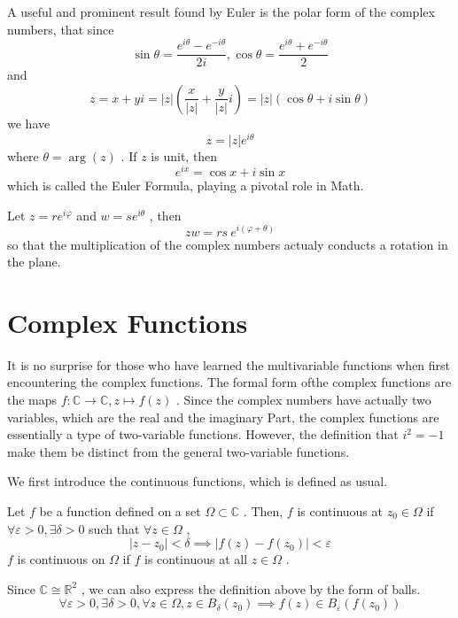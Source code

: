 \documentclass[12pt]{report}
\theoremstyle{mydefstyle}
\newcommand{\RR}{\mathbb{R}}
\newcommand{\CC}{\mathbb{C}}
\begin{document}
A useful and prominent result found by Euler is the polar form of the complex numbers, that since 
\[ \sin \theta = \frac{e^{i \theta}-e^{-i\theta}}{2i}, \cos \theta = \frac{e^{i \theta}+e^{-i\theta}}{2} \]
and 
\[ z=x+yi=|z|\left(\frac{x}{|z|}+\frac{y}{|z|}i\right)=|z|(\cos \theta + i \sin \theta) \]
we have 
\[ z= |z| e^{i\theta} \]
where $\theta = \arg(z)$ . If $z$ is unit, then 
\[ e^{i x} = \cos x + i \sin x \]
which is called the Euler Formula, playing a pivotal role in Math.

Let $z=r e^{i \varphi}$ and $w = s e^{i \theta}$ , then
\[ zw = rs \ e^{i (\varphi + \theta)} \]
so that the multiplication of the complex numbers actualy conducts a rotation in the plane.

\section{Complex Functions}
It is no surprise for those who have learned the multivariable functions when first encountering the complex functions.  The formal form ofthe  complex functions are the maps $f:\CC \longrightarrow \CC, z \mapsto f(z)$ . Since the complex numbers have actually two variables, which are the real and the imaginary Part, the complex functions are essentially a type of two-variable functions. However, the definition that $i^2=-1$ make them be distinct from the general two-variable functions.

We first introduce the continuous functions, which is defined as usual.

\begin{definition}
\label{def:Continuous functions}
    Let $f$ be a function defined on a set $\Omega \subset \CC$ . Then, $f$ is continuous at $z_0 \in \Omega$ if $\forall \varepsilon>0, \exists \delta>0$ such that $\forall z \in \Omega$ , 
    \[ |z-z_0|<\delta \implies |f(z)-f(z_0)|<\varepsilon \]
    $f$ is continuous on $\Omega$ if $f$ is continuous at all $z \in \Omega$ .
\end{definition}

Since $\CC \cong \RR^2$ , we can also express the definition above by the form of balls.
\[ \forall \varepsilon>0, \exists \delta>0, \forall z \in \Omega, z \in B_{\delta}(z_0) \implies f(z) \in B_{\varepsilon}(f(z_0)) \]
\end{document}
